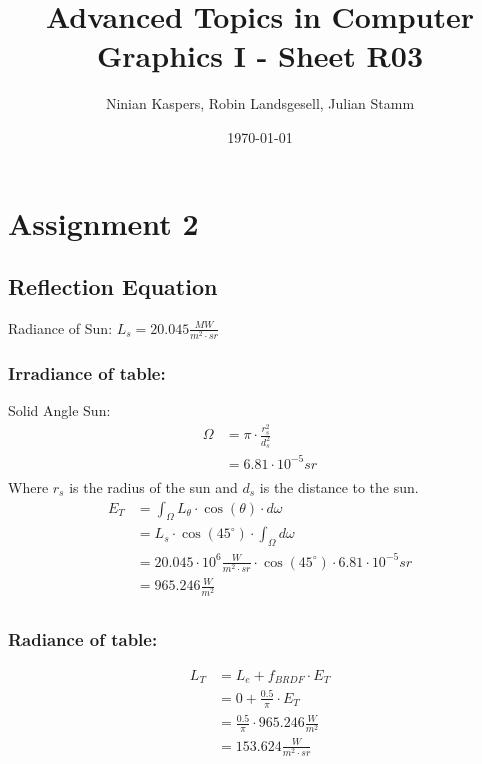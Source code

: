 \documentclass{article}
\title{Advanced Topics in Computer Graphics I - Sheet R03}
\author{Ninian Kaspers, Robin Landsgesell, Julian Stamm}
\date{\today}
\begin{document}
    \maketitle

    \section*{Assignment 2}
    \subsection*{Reflection Equation}
    Radiance of Sun: $L_s = 20.045 \frac{MW}{m^2 \cdot sr}$ \\
    \subsubsection*{Irradiance of table:}
    Solid Angle Sun:
    \begin{align*}
        \Omega &= \pi \cdot \frac{r_s^2}{d_s^2} \\
        &= 6.81 \cdot 10^{-5} sr \\
    \end{align*}
    Where $r_s$ is the radius of the sun and $d_s$ is the distance to the sun.\\
    \begin{align*}
        E_T &= \int_{\Omega} L_{\theta} \cdot \cos(\theta) \cdot d\omega \\
        &= L_s \cdot \cos(45^{\circ}) \cdot \int_{\Omega} d\omega \\
        &= 20.045 \cdot 10^6 \frac{W}{m^2 \cdot sr} \cdot \cos(45^{\circ}) \cdot 6.81 \cdot 10^{-5} sr \\
        &= 965.246 \frac{W}{m^2} \\
    \end{align*}
    \subsubsection*{Radiance of table:}
    \begin{align*}
        L_T &= L_e + f_{BRDF} \cdot E_T \\
        &= 0 + \frac{0.5}{\pi} \cdot E_T \\
        &= \frac{0.5}{\pi} \cdot 965.246 \frac{W}{m^2} \\
        &= 153.624 \frac{W}{m^2 \cdot sr} \\
    \end{align*}
\end{document}
